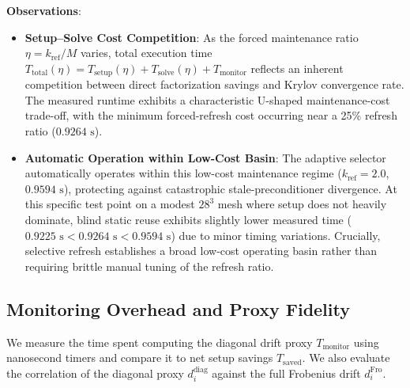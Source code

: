 \documentclass[preprint,12pt,3p]{elsarticle}
\begin{document}
\textbf{Observations}:
\begin{itemize}
    \item \textbf{Setup--Solve Cost Competition}: As the forced maintenance ratio $\eta = k_{\text{ref}}/M$ varies, total execution time $T_{\text{total}}(\eta) = T_{\text{setup}}(\eta) + T_{\text{solve}}(\eta) + T_{\text{monitor}}$ reflects an inherent competition between direct factorization savings and Krylov convergence rate. The measured runtime exhibits a characteristic U-shaped maintenance-cost trade-off, with the minimum forced-refresh cost occurring near a 25\% refresh ratio ($0.9264\text{ s}$).
    \item \textbf{Automatic Operation within Low-Cost Basin}: The adaptive selector automatically operates within this low-cost maintenance regime ($k_{\text{ref}} = 2.0$, $0.9594\text{ s}$), protecting against catastrophic stale-preconditioner divergence. At this specific test point on a modest $28^3$ mesh where setup does not heavily dominate, blind static reuse exhibits slightly lower measured time ($0.9225\text{ s} < 0.9264\text{ s} < 0.9594\text{ s}$) due to minor timing variations. Crucially, selective refresh establishes a broad low-cost operating basin rather than requiring brittle manual tuning of the refresh ratio.
\end{itemize}

\subsection{Monitoring Overhead and Proxy Fidelity}
\label{subsec:res_overhead}
We measure the time spent computing the diagonal drift proxy $T_{\text{monitor}}$ using nanosecond timers and compare it to net setup savings $T_{\text{saved}}$. We also evaluate the correlation of the diagonal proxy $d_i^{\text{diag}}$ against the full Frobenius drift $d_i^{\text{Fro}}$.

\begin{table}[htbp]
\centering
\small
\caption{Historical benchmark: Monitoring overhead fractions (setup-normalized $\eta_{\text{mon}}^{\text{setup}}$ and total-time-normalized $\eta_{\text{mon}}^{\text{total}}$) and correlation between diagonal drift proxy and Frobenius drift.}
\label{tab:pillar3_overhead}
\end{table}
\end{document}
